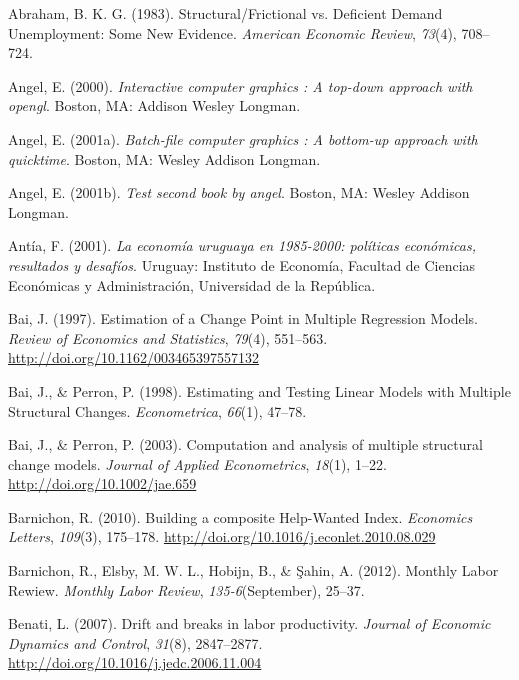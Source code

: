 \documentclass[12pt,twoside]{reedthesis}
\begin{document}
\setlength{\parindent}{-0.20in}
\setlength{\leftskip}{0.20in}
\setlength{\parskip}{8pt}

\hypertarget{refs}{}
\leavevmode\hypertarget{ref-Abraham1983}{}%
Abraham, B. K. G. (1983). Structural/Frictional vs. Deficient Demand Unemployment: Some New Evidence. \emph{American Economic Review}, \emph{73}(4), 708--724.

\leavevmode\hypertarget{ref-angel2000}{}%
Angel, E. (2000). \emph{Interactive computer graphics : A top-down approach with opengl}. Boston, MA: Addison Wesley Longman.

\leavevmode\hypertarget{ref-angel2001}{}%
Angel, E. (2001a). \emph{Batch-file computer graphics : A bottom-up approach with quicktime}. Boston, MA: Wesley Addison Longman.

\leavevmode\hypertarget{ref-angel2002a}{}%
Angel, E. (2001b). \emph{Test second book by angel}. Boston, MA: Wesley Addison Longman.

\leavevmode\hypertarget{ref-Antia2001}{}%
Antía, F. (2001). \emph{La economía uruguaya en 1985-2000: políticas económicas, resultados y desafíos}. Uruguay: Instituto de Economía, Facultad de Ciencias Económicas y Administración, Universidad de la República.

\leavevmode\hypertarget{ref-Bai1997}{}%
Bai, J. (1997). Estimation of a Change Point in Multiple Regression Models. \emph{Review of Economics and Statistics}, \emph{79}(4), 551--563. \url{http://doi.org/10.1162/003465397557132}

\leavevmode\hypertarget{ref-BaiPerron1998}{}%
Bai, J., \& Perron, P. (1998). Estimating and Testing Linear Models with Multiple Structural Changes. \emph{Econometrica}, \emph{66}(1), 47--78.

\leavevmode\hypertarget{ref-BaiPerron2003}{}%
Bai, J., \& Perron, P. (2003). Computation and analysis of multiple structural change models. \emph{Journal of Applied Econometrics}, \emph{18}(1), 1--22. \url{http://doi.org/10.1002/jae.659}

\leavevmode\hypertarget{ref-Barnichon2010}{}%
Barnichon, R. (2010). Building a composite Help-Wanted Index. \emph{Economics Letters}, \emph{109}(3), 175--178. \url{http://doi.org/10.1016/j.econlet.2010.08.029}

\leavevmode\hypertarget{ref-Barnichon2012}{}%
Barnichon, R., Elsby, M. W. L., Hobijn, B., \& Şahin, A. (2012). Monthly Labor Rewiew. \emph{Monthly Labor Review}, \emph{135-6}(September), 25--37.

\leavevmode\hypertarget{ref-Benati2007}{}%
Benati, L. (2007). Drift and breaks in labor productivity. \emph{Journal of Economic Dynamics and Control}, \emph{31}(8), 2847--2877. \url{http://doi.org/10.1016/j.jedc.2006.11.004}
\end{document}
